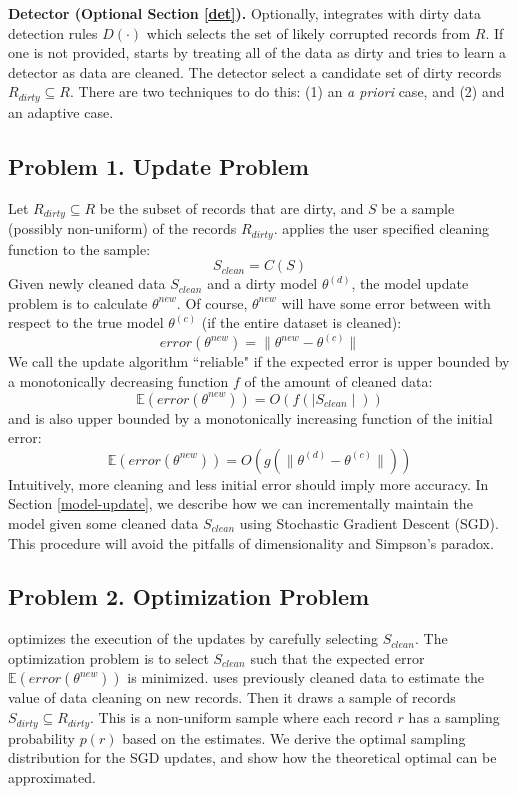 \vspace{0.25em}

\noindent\textbf{Detector (Optional Section \ref{det}). } Optionally, \sys integrates with dirty data detection rules $D(\cdot)$ which selects the set of likely corrupted records from $R$.
If one is not provided, \sys starts by treating all of the data as dirty and tries to learn a detector as data are cleaned.
 The detector select a candidate set of dirty records $R_{dirty} \subseteq R$. There are two techniques to do this: (1) an \emph{a priori} case, and (2) and an adaptive case. 

\subsection{Problem 1. Update Problem}\label{updp}
Let $R_{dirty} \subseteq R$ be the subset of records that are dirty, and $S$ be a sample (possibly non-uniform) of the records $R_{dirty}$.
\sys applies the user specified cleaning function to the sample:
\[
S_{clean} = C(S)
\]
Given newly cleaned data $S_{clean}$ and a dirty model $\theta^{(d)}$, the model update problem is to calculate $\theta^{new}$. 
Of course, $\theta^{new}$ will have some error between with respect to the true model $\theta^{(c)}$ (if the entire dataset is cleaned):
\[
error(\theta^{new}) = \| \theta^{new} - \theta^{(c)} \|
\]
We call the update algorithm ``reliable" if the expected error is upper bounded by a monotonically decreasing function $f$ of the amount of cleaned data:
\[
\mathbb{E}(error(\theta^{new})) = O(f(\mid S_{clean} \mid))
\]
and is also upper bounded by a monotonically increasing function of the initial error:
\[
\mathbb{E}(error(\theta^{new})) = O(g(\| \theta^{(d)} - \theta^{(c)} \|))
\]
Intuitively, more cleaning and less initial error should imply more accuracy.
In Section \ref{model-update}, we describe how we can incrementally maintain the model given some cleaned data $S_{clean}$ using Stochastic Gradient Descent (SGD).
This procedure will avoid the pitfalls of dimensionality and Simpson's paradox.

\subsection{Problem 2. Optimization Problem}\label{optp}
\sys optimizes the execution of the updates by carefully selecting $S_{clean}$.
The optimization problem is to select $S_{clean}$ such that the expected error $\mathbb{E}(error(\theta^{new}))$ is minimized.
\sys uses previously cleaned data to estimate the value of data cleaning on new records.
Then it draws a sample of records $S_{dirty} \subseteq R_{dirty}$. This is a non-uniform sample where each record $r$ has a sampling probability $p(r)$ based on the estimates.
We derive the optimal sampling distribution for the SGD updates, and show how the theoretical optimal can be approximated.

